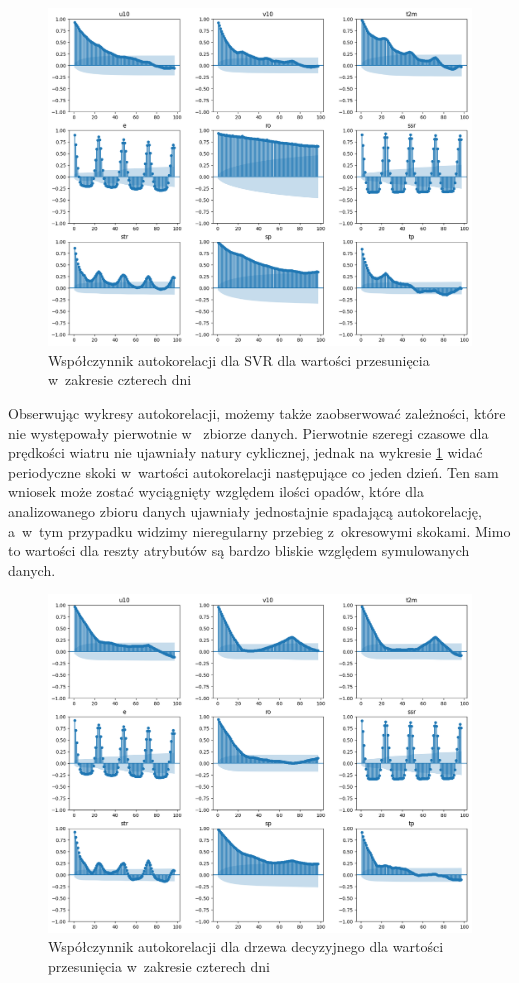 \begin{figure}[H]
    \centering
    \includegraphics[width=.8\textwidth]{images/svr_autocorr.png}
    \caption[Autokorelacja dla SVR]{Współczynnik autokorelacji dla SVR dla wartości przesunięcia w~zakresie czterech dni}
    \label{svr-autocorr}
\end{figure}

Obserwując wykresy autokorelacji, możemy także zaobserwować zależności, które nie występowały pierwotnie w~
zbiorze danych. Pierwotnie szeregi czasowe dla prędkości wiatru nie ujawniały natury cyklicznej, jednak 
na wykresie \ref{svr-autocorr} widać periodyczne skoki w~wartości autokorelacji następujące co jeden dzień.
Ten sam wniosek może zostać wyciągnięty względem ilości opadów, które dla analizowanego zbioru danych 
ujawniały jednostajnie spadającą autokorelację, a~w~tym przypadku widzimy nieregularny przebieg z~okresowymi
skokami. Mimo to wartości dla reszty atrybutów są bardzo bliskie względem symulowanych danych.

\begin{figure}[H]
    \centering
    \includegraphics[width=\textwidth]{images/dt_autocorr.png}
    \caption[Autokorelacja dla drzewa decyzyjnego]{Współczynnik autokorelacji dla drzewa decyzyjnego dla wartości przesunięcia w~zakresie czterech dni}
    \label{dt-autocorr}
\end{figure}

